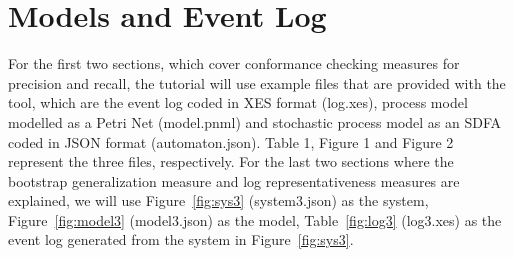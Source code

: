 \section*{Models and Event Log}
For the first two sections, which cover conformance checking measures for precision and recall,
the tutorial will use example files that are provided with the tool, which are the event log coded in XES format (log.xes), process model modelled as a Petri Net (model.pnml) and stochastic process model as an SDFA coded in JSON format (automaton.json). Table 1, Figure 1 and Figure 2 represent the three files, respectively.
For the last two sections where the bootstrap generalization measure and log representativeness measures are explained,
we will use Figure~\ref{fig:sys3} (system3.json) as the system, Figure~\ref{fig:model3} (model3.json) as the model, Table~\ref{fig:log3} (log3.xes) as the event log generated from the system in Figure~\ref{fig:sys3}.

